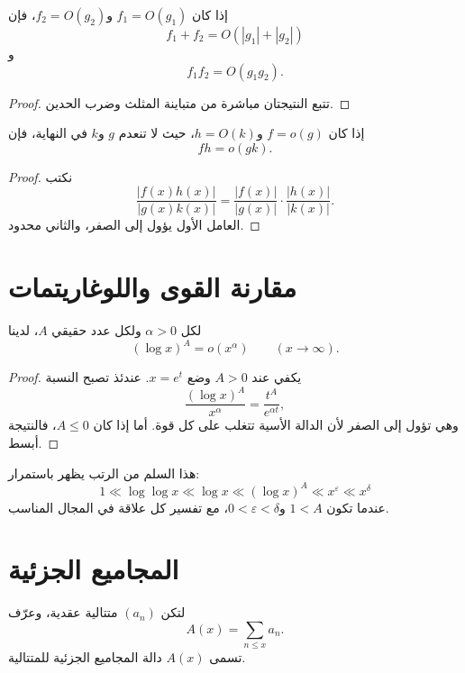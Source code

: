 \begin{proposition}
\label{prop:big-o-arithmetic}
\provedhere
إذا كان \(f_1=O(g_1)\) و\(f_2=O(g_2)\)، فإن
\[
f_1+f_2=O(|g_1|+|g_2|)
\]
و
\[
f_1f_2=O(g_1g_2).
\]
\end{proposition}

\begin{proof}
تتبع النتيجتان مباشرة من متباينة المثلث وضرب الحدين.
\end{proof}

\begin{proposition}
\label{prop:little-o-times-big-o}
\provedhere
إذا كان \(f=o(g)\) و\(h=O(k)\)، حيث لا تنعدم \(g\) و\(k\) في
النهاية، فإن
\[
fh=o(gk).
\]
\end{proposition}

\begin{proof}
نكتب
\[
\frac{|f(x)h(x)|}{|g(x)k(x)|}
=
\frac{|f(x)|}{|g(x)|}\cdot
\frac{|h(x)|}{|k(x)|}.
\]
العامل الأول يؤول إلى الصفر، والثاني محدود.
\end{proof}

\section{مقارنة القوى واللوغاريتمات}

\begin{theorem}
\label{thm:log-powers-below-powers}
\provedhere
لكل \(\alpha>0\) ولكل عدد حقيقي \(A\)، لدينا
\[
(\log x)^A=o(x^\alpha)
\qquad (x\to\infty).
\]
\end{theorem}

\begin{proof}
يكفي عند \(A>0\) وضع \(x=e^t\). عندئذ تصبح النسبة
\[
\frac{(\log x)^A}{x^\alpha}
=
\frac{t^A}{e^{\alpha t}},
\]
وهي تؤول إلى الصفر لأن الدالة الأسية تتغلب على كل قوة. أما إذا كان \(A\leq 0\)، فالنتيجة أبسط.
\end{proof}

هذا السلم من الرتب يظهر باستمرار:
\[
1\ll \log\log x\ll \log x\ll (\log x)^A\ll x^\varepsilon\ll x^\delta
\]
عندما تكون \(1<A\) و\(0<\varepsilon<\delta\)، مع تفسير كل علاقة في المجال المناسب.

\section{المجاميع الجزئية}

لتكن \((a_n)\) متتالية عقدية، وعرّف
\[
A(x)=\sum_{n\leq x}a_n.
\]
تسمى \(A(x)\) دالة المجاميع الجزئية للمتتالية.

